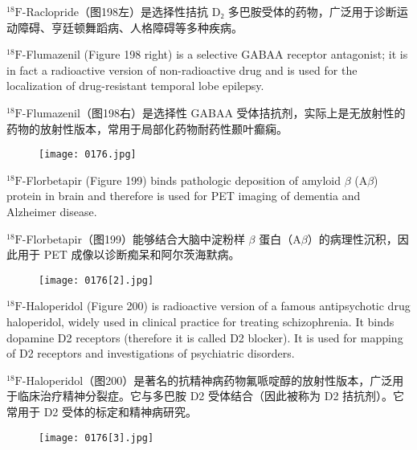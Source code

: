 \documentclass[dvipsnames, svgnames,a4paper,11pt]{article}
\begin{document}
${}^\mathrm{18}\mathrm{F}$-Raclopride（图198左）是选择性拮抗 D₂ 多巴胺受体的药物，广泛用于诊断运动障碍、亨廷顿舞蹈病、人格障碍等多种疾病。

${}^\mathrm{18}\mathrm{F}$-Flumazenil (Figure 198 right) is a selective GABAA receptor antagonist; it is in
fact a radioactive version of non-radioactive drug and is used for the localization of
drug-resistant temporal lobe epilepsy.

${}^\mathrm{18}\mathrm{F}$-Flumazenil（图198右）是选择性 GABAA 受体拮抗剂，实际上是无放射性的药物的放射性版本，常用于局部化药物耐药性颞叶癫痫。

\begin{figure}[h]
	\centering
    \texttt{[image: 0176.jpg]}   
     \label{fig199}
\end{figure}

${}^\mathrm{18}\mathrm{F}$-Florbetapir (Figure 199) binds pathologic deposition of amyloid $\beta$ (A$\beta$) protein in
brain and therefore is used for PET imaging of dementia and Alzheimer disease.

${}^\mathrm{18}\mathrm{F}$-Florbetapir（图199）能够结合大脑中淀粉样 $\beta$ 蛋白（A$\beta$）的病理性沉积，因此用于 PET 成像以诊断痴呆和阿尔茨海默病。

\begin{figure}[h]
	\centering
    \texttt{[image: 0176[2].jpg]}   
     \label{fig200}
\end{figure}

${}^\mathrm{18}\mathrm{F}$-Haloperidol (Figure 200) is radioactive version of a famous antipsychotic drug
haloperidol, widely used in clinical practice for treating schizophrenia. It binds
dopamine D2 receptors (therefore it is called D2 blocker). It is used for mapping of D2
receptors and investigations of psychiatric disorders.

${}^\mathrm{18}\mathrm{F}$-Haloperidol（图200）是著名的抗精神病药物氟哌啶醇的放射性版本，广泛用于临床治疗精神分裂症。它与多巴胺 D2 受体结合（因此被称为 D2 拮抗剂）。它常用于 D2 受体的标定和精神病研究。

\begin{figure}[h]
	\centering
    \texttt{[image: 0176[3].jpg]}   
     \label{fig201}
\end{figure}
\end{document}
